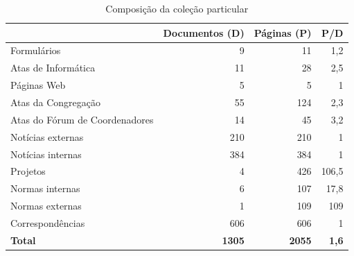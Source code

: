 \begin{table}[h]
\caption{Composição da coleção particular}
\centering
\begin{tabular}{@{}lrrr@{}}
\toprule
                               & \multicolumn{1}{c}{\textbf{Documentos (D)}} & \multicolumn{1}{c}{\textbf{Páginas (P)}} & \multicolumn{1}{c}{\textbf{P/D}} \\ \midrule
Formulários                    & 9                                           & 11                                       & 1,2                              \\ %
Atas de Informática            & 11                                          & 28                                       & 2,5                              \\ %
Páginas Web                    & 5                                           & 5                                        & 1                                \\ %
Atas da Congregação            & 55                                          & 124                                      & 2,3                              \\ %
Atas do Fórum de Coordenadores & 14                                          & 45                                       & 3,2                              \\ %
Notícias externas              & 210                                         & 210                                      & 1                                \\ %
Notícias internas              & 384                                         & 384                                      & 1                                \\ %
Projetos                       & 4                                           & 426                                      & 106,5                            \\ %
Normas internas                & 6                                           & 107                                      & 17,8                             \\ %
Normas externas                & 1                                           & 109                                      & 109                              \\ %
Correspondências               & 606                                         & 606                                      & 1                                \\ \midrule
\textbf{Total}                 & \textbf{1305}                               & \textbf{2055}                            & \textbf{1,6}                     \\ \bottomrule
\end{tabular}
\label{tab:documentosParticular}
\end{table}

